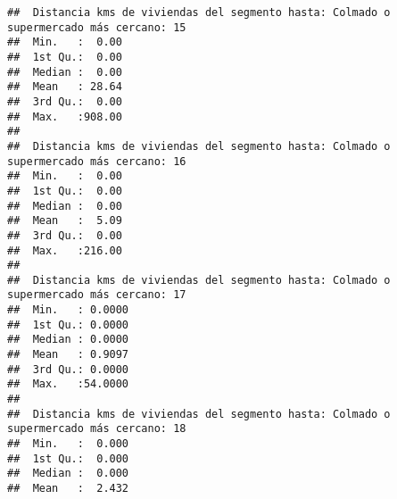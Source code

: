 \documentclass[11pt,]{article}
\begin{document}
\begin{verbatim}
##  Distancia kms de viviendas del segmento hasta: Colmado o supermercado más cercano: 15
##  Min.   :  0.00                                                                       
##  1st Qu.:  0.00                                                                       
##  Median :  0.00                                                                       
##  Mean   : 28.64                                                                       
##  3rd Qu.:  0.00                                                                       
##  Max.   :908.00                                                                       
##                                                                                       
##  Distancia kms de viviendas del segmento hasta: Colmado o supermercado más cercano: 16
##  Min.   :  0.00                                                                       
##  1st Qu.:  0.00                                                                       
##  Median :  0.00                                                                       
##  Mean   :  5.09                                                                       
##  3rd Qu.:  0.00                                                                       
##  Max.   :216.00                                                                       
##                                                                                       
##  Distancia kms de viviendas del segmento hasta: Colmado o supermercado más cercano: 17
##  Min.   : 0.0000                                                                      
##  1st Qu.: 0.0000                                                                      
##  Median : 0.0000                                                                      
##  Mean   : 0.9097                                                                      
##  3rd Qu.: 0.0000                                                                      
##  Max.   :54.0000                                                                      
##                                                                                       
##  Distancia kms de viviendas del segmento hasta: Colmado o supermercado más cercano: 18
##  Min.   :  0.000                                                                      
##  1st Qu.:  0.000                                                                      
##  Median :  0.000                                                                      
##  Mean   :  2.432                                                                      

\end{verbatim}
\end{document}
